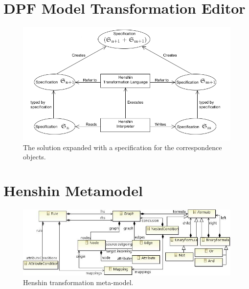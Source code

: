 \section{DPF Model Transformation Editor}







\begin{figure}[H]
	\centering
	\includegraphics[scale=0.7]{./Figures/TransformationSolution_Correspond.png}
	\caption[Specification for the correspondence objects]
	{The solution expanded with a specification for the correspondence objects.}
	\label{fig:Solution_CorrespondanceObjects}
\end{figure}



\section{Henshin Metamodel}

\begin{figure}[H]
	\centering
	\includegraphics[scale=0.8]{./Figures/Henshin_metamodel.png}
	\caption[Henshin transformation meta-model]
	{Henshin transformation meta-model\cite{Arendt2010}.}
	\label{fig:Henshin_metamodel}
\end{figure}

